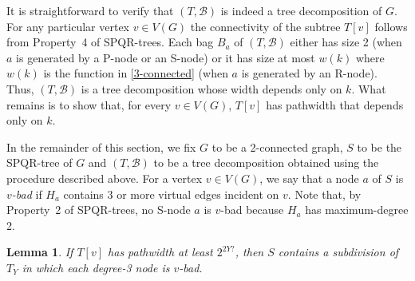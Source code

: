 \documentclass[a4paper,11pt]{article}
\theoremstyle{plain}
\newtheorem{lemma}[theorem]{Lemma}
\theoremstyle{definition}
\begin{document}
It is straightforward to verify that $(T,\mathcal{B})$ is indeed a
tree decomposition of $G$. For any particular vertex $v\in V(G)$ the
connectivity of the subtree $T[v]$ follows from Property~4 of SPQR-trees.
Each bag $B_a$ of $(T,\mathcal{B})$ either has size 2 (when $a$ is
generated by a P-node or an S-node) or it has size at most $w(k)$ where $w(k)$ is
the function in \cref{3-connected} (when $a$ is generated by an R-node).
Thus, $(T,\mathcal{B})$ is a tree decomposition whose width depends only
on $k$.  What remains is to show that, for every $v\in V(G)$, $T[v]$
has pathwidth that depends only on $k$.

In the remainder of this section, we fix $G$ to be a 2-connected graph,
$S$ to be the SPQR-tree of $G$ and $(T,\mathcal{B})$ to be a tree
decomposition obtained using the procedure described above.  For a
vertex $v\in V(G)$, we say that a node $a$ of $S$ is \emph{$v$-bad}
if $H_a$ contains 3 or more virtual edges incident on $v$. Note that,
by Property~2 of SPQR-trees, no S-node $a$ is $v$-bad because $H_a$ has
maximum-degree 2.

\begin{lemma}
  \label{roof-lifting}
  If $T[v]$ has pathwidth at least $2^{2Y?}$, then $S$ contains a subdivision of $T_Y$ in which each degree-3 node is $v$-bad.
\end{lemma}
\end{document}
